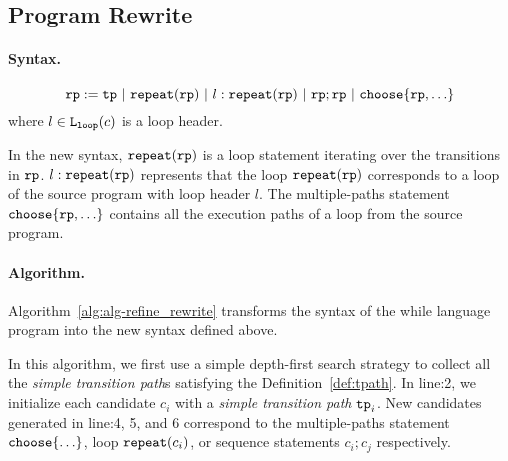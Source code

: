 \subsection{Program Rewrite}
\paragraph{Syntax.}
\[
    \rprog := \tpath ~|~ \rprepeat(\rprog) ~|~ l : \rprepeat(\rprog) ~|~ \rprog;\rprog ~|~ \rpchoose{\rprog, \ldots} 
\]
where $l\in \mathtt{L}_{\mathtt{loop}}(c)$ is a loop header.

In the new syntax, $\mathtt{repeat}(\mathtt{rp})$ is a loop statement iterating over the transitions in $\mathtt{rp}$.
$l: \mathtt{repeat}(\mathtt{rp})$ represents that the loop $ \mathtt{repeat}(\mathtt{rp})$
corresponds to a loop of the source program with loop header $l$.
The multiple-paths statement $\rpchoose{\rprog, \ldots} $ contains all the execution paths of a loop from the source program.


\paragraph{Algorithm.}
Algorithm~\ref{alg:alg-refine_rewrite} transforms the syntax of the while language program 
into the new syntax defined above.

In this algorithm, we first use a simple depth-first search strategy to collect all the \emph{simple transition path}s satisfying the Definition~\ref{def:tpath}. 
In line:2, we initialize each candidate $c_i$ with a \emph{simple transition path} $\mathtt{tp}_i$. 
New candidates generated in line:4, 5, and 6 correspond to the multiple-paths statement $\rpchoose{\ldots}$,
loop $\mathtt{repeat}(c_i)$, or sequence statements $c_i; c_j$ respectively.

